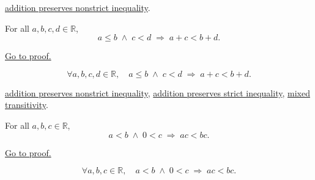 \begin{dependencies}
\hyperref[thm:ineq-nonstrict-add-both-sides]{addition preserves nonstrict inequality}.
\end{dependencies}


\begin{theorem}
\label{thm:ineq-mixed-add}
For all $a, b, c, d \in \mathbb{R}$,
\[
  a \le b \;\land\; c < d \;\Rightarrow\; a + c < b + d.
\]
\end{theorem}



\begin{remark*}[Proof]
\hyperref[prf:ineq-mixed-add]{Go to proof.}
\end{remark*}

\begin{remark*}
\[
  \forall a, b, c, d \in \mathbb{R},\quad
  a \le b \;\land\; c < d \;\Rightarrow\; a + c < b + d.
\]
\end{remark*}

\begin{dependencies}
\hyperref[thm:ineq-nonstrict-add-both-sides]{addition preserves nonstrict inequality},
\hyperref[thm:ineq-add-both-sides]{addition preserves strict inequality},
\hyperref[thm:ineq-transitivity-mixed]{mixed transitivity}.
\end{dependencies}


\begin{theorem}
\label{thm:ineq-multiply-positive}
For all $a, b, c \in \mathbb{R}$,
\[
  a < b \;\land\; 0 < c \;\Rightarrow\; ac < bc.
\]
\end{theorem}



\begin{remark*}[Proof]
\hyperref[prf:ineq-multiply-positive]{Go to proof.}
\end{remark*}

\begin{remark*}
\[
  \forall a, b, c \in \mathbb{R},\quad
  a < b \;\land\; 0 < c \;\Rightarrow\; ac < bc.
\]
\end{remark*}

